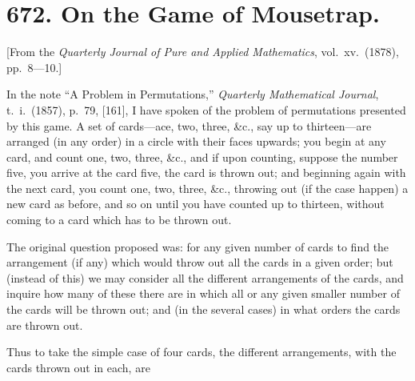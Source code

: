 \documentclass[12pt,a4paper]{article}
\theoremstyle{cayley}
\theoremstyle{definition}
\numberwithin{equation}{section}
\begin{document}
\newpage

\section*{672. On the Game of Mousetrap.}

[From the \textit{Quarterly Journal of Pure and Applied Mathematics}, vol.\ xv.\ (1878), pp.\ 8---10.]

In the note ``A Problem in Permutations,'' \textit{Quarterly Mathematical Journal}, t.\ i.\ (1857), p.\ 79, [161], I have spoken of the problem of permutations presented by this game. A set of cards---ace, two, three, \&c., say up to thirteen---are arranged (in any order) in a circle with their faces upwards; you begin at any card, and count one, two, three, \&c., and if upon counting, suppose the number five, you arrive at the card five, the card is thrown out; and beginning again with the next card, you count one, two, three, \&c., throwing out (if the case happen) a new card as before, and so on until you have counted up to thirteen, without coming to a card which has to be thrown out.

The original question proposed was: for any given number of cards to find the arrangement (if any) which would throw out all the cards in a given order; but (instead of this) we may consider all the different arrangements of the cards, and inquire how many of these there are in which all or any given smaller number of the cards will be thrown out; and (in the several cases) in what orders the cards are thrown out.

Thus to take the simple case of four cards, the different arrangements, with the cards thrown out in each, are
\end{document}
